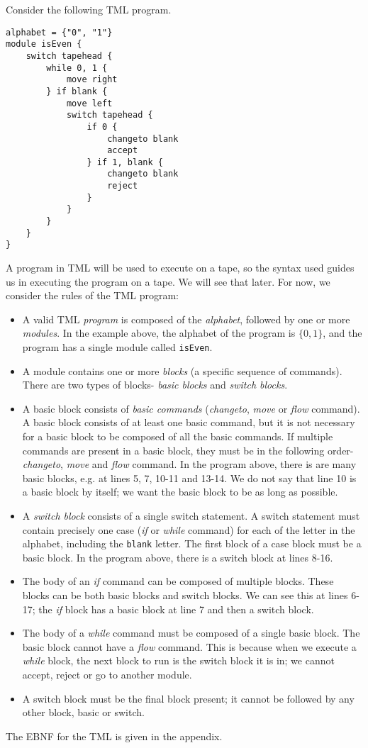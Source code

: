 Consider the following TML program.
\begin{lstlisting}[language=TML]
alphabet = {"0", "1"}
module isEven {
    switch tapehead {
        while 0, 1 {
            move right
        } if blank {
            move left
            switch tapehead {
                if 0 {
                    changeto blank
                    accept
                } if 1, blank {
                    changeto blank
                    reject
                }
            }
        }
    }
}
\end{lstlisting}
A program in TML will be used to execute on a tape, so the syntax used guides us in executing the program on a tape. We will see that later. For now, we consider the rules of the TML program:
\begin{itemize}
    \item A valid TML \emph{program} is composed of the \emph{alphabet}, followed by one or more \emph{modules}. In the example above, the alphabet of the program is $\{0, 1\}$, and the program has a single module called \texttt{isEven}.
    \item A module contains one or more \emph{blocks} (a specific sequence of commands). There are two types of blocks- \emph{basic blocks} and \emph{switch blocks}.
    \item A basic block consists of \emph{basic commands} (\textit{changeto}, \textit{move} or \textit{flow} command). A basic block consists of at least one basic command, but it is not necessary for a basic block to be composed of all the basic commands. If multiple commands are present in a basic block, they must be in the following order- \textit{changeto}, \textit{move} and \textit{flow} command. In the program above, there is are many basic blocks, e.g. at lines 5, 7, 10-11 and 13-14. We do not say that line 10 is a basic block by itself; we want the basic block to be as long as possible.
    \item A \emph{switch block} consists of a single switch statement. A switch statement must contain precisely one case (\textit{if} or \textit{while} command) for each of the letter in the alphabet, including the \texttt{blank} letter. The first block of a case block must be a basic block. In the program above, there is a switch block at lines 8-16.
    \item The body of an \textit{if} command can be composed of multiple blocks. These blocks can be both basic blocks and switch blocks. We can see this at lines 6-17; the \textit{if} block has a basic block at line 7 and then a switch block.
    \item The body of a \textit{while} command must be composed of a single basic block. The basic block cannot have a \textit{flow} command. This is because when we execute a \textit{while} block, the next block to run is the switch block it is in; we cannot accept, reject or go to another module.
    \item A switch block must be the final block present; it cannot be followed by any other block, basic or switch.
\end{itemize}
The EBNF for the TML is given in the appendix.

